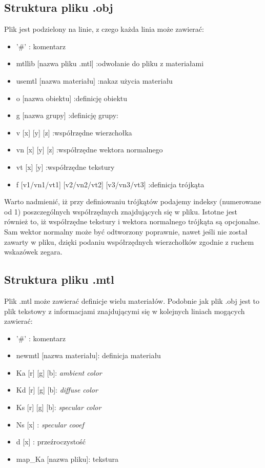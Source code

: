 \subsection{Struktura pliku .obj}
Plik jest podzielony na linie, z czego każda linia może zawierać:
\begin{itemize}
\item '\#' : komentarz 
\item mtllib [nazwa pliku .mtl] :odwołanie do pliku z materiałami
\item usemtl [nazwa materiału]  :nakaz użycia materiału
\item o [nazwa obiektu]         :definicję obiektu
\item g [nazwa grupy]           :definicję grupy: 
\item v [x] [y] [z]             :współrzędne wierzchołka
\item vn [x] [y] [z]            :współrzędne wektora normalnego
\item vt [x] [y]                :współrzędne tekstury
\item f [v1/vn1/vt1] [v2/vn2/vt2] [v3/vn3/vt3] :definicja trójkąta 
\end{itemize}
Warto nadmienić, iż przy definiowaniu trójkątów podajemy indeksy (numerowane od 1) poszczególnych współrzędnych znajdujących się w pliku.
Istotne jest również to, iż współrzędne tekstury i wektora normalnego trójkąta są opcjonalne. Sam wektor normalny może być odtworzony poprawnie,
nawet jeśli nie został zawarty w pliku, dzięki podaniu współrzędnych wierzchołków zgodnie z ruchem wskazówek zegara.


\subsection{Struktura pliku .mtl}
Plik .mtl może zawierać definicje wielu materiałów. Podobnie jak plik .obj jest to plik tekstowy z informacjami znajdującymi
się w kolejnych liniach mogących zawierać:
\begin{itemize}
\item '\#' : komentarz 
\item newmtl [nazwa materiału]: definicja materiału
\item Ka [r] [g] [b]: \textit{ambient color}
\item Kd [r] [g] [b]: \textit{diffuse color}
\item Ks [r] [g] [b]: \textit{specular color}
\item Ns [x]        : \textit{specular cooef}
\item d  [x]        : przeźroczystość
\item map\_Ka [nazwa pliku]: tekstura 
\end{itemize}



